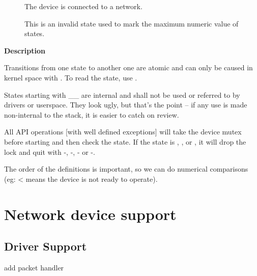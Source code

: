 \documentclass[a4paper,8pt,english]{sphinxmanual}
\begin{document}
\begin{description}
\item[{}] \leavevmode
The device is connected to a network.

\item[{}] \leavevmode
This is an invalid state used to mark the
maximum numeric value of states.

\end{description}

\textbf{Description}

Transitions from one state to another one are atomic and can only
be caused in kernel space with {\hyperref[networking/kapi:c.wimax_state_change]{\emph{}}}. To read the
state, use {\hyperref[networking/kapi:c.wimax_state_get]{\emph{}}}.

States starting with \_\_ are internal and shall not be used or
referred to by drivers or userspace. They look ugly, but that's the
point -- if any use is made non-internal to the stack, it is easier
to catch on review.

All API operations {[}with well defined exceptions{]} will take the
device mutex before starting and then check the state. If the state
is , ,  or
, it will drop the lock and quit with
-, -, - or -.

The order of the definitions is important, so we can do numerical
comparisons (eg: \textless{}  means the device is not ready
to operate).


\section{Network device support}
\label{networking/kapi:network-device-support}

\subsection{Driver Support}
\label{networking/kapi:driver-support}

\begin{fulllineitems}
\label{networking/kapi:c.dev_add_pack}
add packet handler

\end{fulllineitems}
\end{document}
